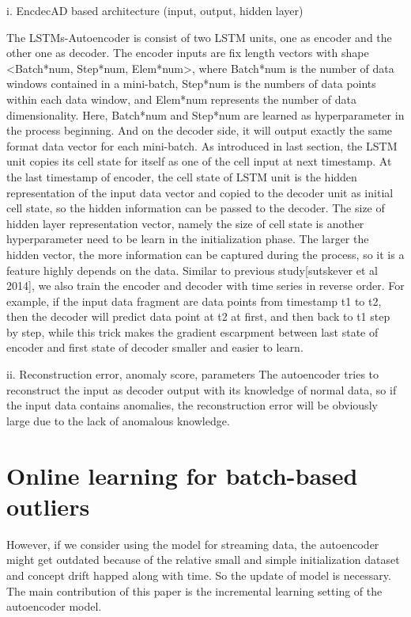 i.	EncdecAD based architecture (input, output, hidden layer)

The LSTMs-Autoencoder is consist of two LSTM units, one as encoder and the other one as decoder. The encoder inputs are fix length vectors with shape <Batch*num, Step*num, Elem*num>, where Batch*num is the number of data windows contained in a mini-batch, Step*num is the numbers of data points within each data window, and Elem*num represents the number of data dimensionality. Here, Batch*num and Step*num are learned as hyperparameter in the process beginning. And on the decoder side, it will output exactly the same format data vector for each mini-batch. As introduced in last section, the LSTM unit copies its cell state for itself as one of the cell input at next timestamp. At the last timestamp of encoder, the cell state of LSTM unit is the hidden representation of the input data vector and copied to the decoder unit as initial cell state, so the hidden information can be passed to the decoder. The size of hidden layer representation vector, namely the size of cell state is another hyperparameter need to be learn in the initialization phase. The larger the hidden vector, the more information can be captured during the process, so it is a feature highly depends on the data. Similar to previous study[sutskever et al 2014], we also train the encoder and decoder with time series in reverse order. For example, if the input data fragment are data points from timestamp t1 to t2, then the decoder will predict data point at t2 at first, and then back to t1 step by step, while this trick makes the gradient escarpment between last state of encoder and first state of decoder smaller and easier to learn. 

ii.	Reconstruction error, anomaly score, parameters
The autoencoder tries to reconstruct the input as decoder output with its knowledge of normal data, so if the input data contains anomalies, the reconstruction error will be obviously large due to the lack of anomalous knowledge.


\section{Online learning for batch-based outliers}
\label{sec:Online learning for batch-based outliers}
However, if we consider using the model for streaming data, the autoencoder might get outdated because of the relative small and simple initialization dataset and concept drift happed along with time. So the update of model is necessary. The main contribution of this paper is the incremental learning setting of the autoencoder model.


